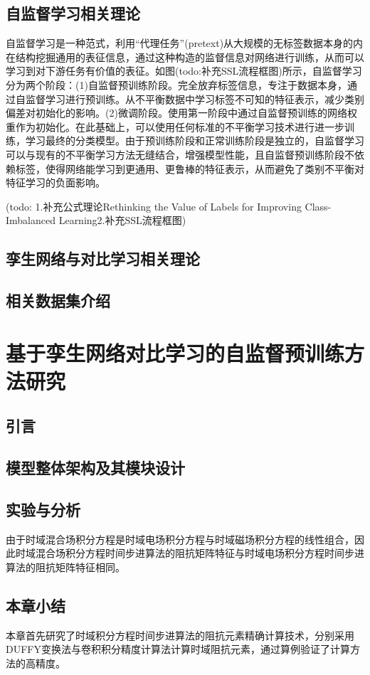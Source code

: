 \documentclass[master]{thesis-uestc}
\begin{document}
\section{自监督学习相关理论}
自监督学习是一种范式，利用“代理任务”(pretext)从大规模的无标签数据本身的内在结构挖掘通用的表征信息，通过这种构造的监督信息对网络进行训练，从而可以学习到对下游任务有价值的表征。如图(todo:补充SSL流程框图)所示，自监督学习分为两个阶段：(1)自监督预训练阶段。完全放弃标签信息，专注于数据本身，通过自监督学习进行预训练。从不平衡数据中学习标签不可知的特征表示，减少类别偏差对初始化的影响。(2)微调阶段。使用第一阶段中通过自监督预训练的网络权重作为初始化。在此基础上，可以使用任何标准的不平衡学习技术进行进一步训练，学习最终的分类模型。由于预训练阶段和正常训练阶段是独立的，自监督学习可以与现有的不平衡学习方法无缝结合，增强模型性能，且自监督预训练阶段不依赖标签，使得网络能学习到更通用、更鲁棒的特征表示，从而避免了类别不平衡对特征学习的负面影响。

(todo: 1.补充公式理论Rethinking the Value of Labels for Improving Class-Imbalanced Learning2.补充SSL流程框图)
\section{孪生网络与对比学习相关理论}
\section{相关数据集介绍}

\chapter{基于孪生网络对比学习的自监督预训练方法研究}
\section{引言}
\section{模型整体架构及其模块设计}
\section{实验与分析}
由于时域混合场积分方程是时域电场积分方程与时域磁场积分方程的线性组合，因此时域混合场积分方程时间步进算法的阻抗矩阵特征与时域电场积分方程时间步进算法的阻抗矩阵特征相同。
\section{本章小结}
本章首先研究了时域积分方程时间步进算法的阻抗元素精确计算技术，分别采用DUFFY变换法与卷积积分精度计算法计算时域阻抗元素，通过算例验证了计算方法的高精度。
\end{document}

